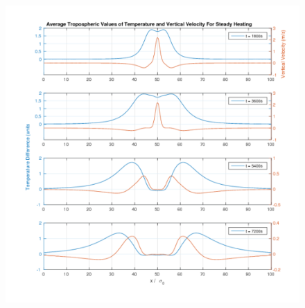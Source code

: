 \documentclass[a4paper,10pt]{article}
\begin{document}
\begin{figure}[h!]
  \caption{}
  \centering
    \includegraphics[width=1\textwidth]{trop_values_transient.pdf}
  \label{trop_values_transient}
\end{figure}
\end{document}
